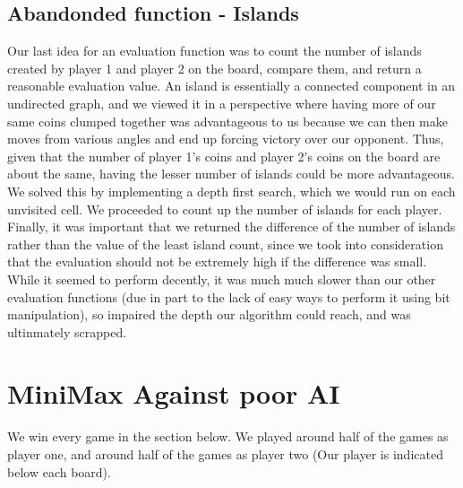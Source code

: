 \documentclass{article}
\begin{document}
\subsection{Abandonded function - Islands}
Our last idea for an evaluation function was to count the number of islands created by player 1 and player 2 on the board, compare them, and return a reasonable evaluation value. An island is essentially a connected component in an undirected graph, and we viewed it in a perspective where having more of our same coins clumped together was advantageous to us because we can then make moves from various angles and end up forcing victory over our opponent. Thus, given that the number of player 1's coins and player 2's coins on the board are about the same, having the lesser number of islands could be more advantageous. We solved this by implementing a depth first search, which we would run on each unvisited cell. We proceeded to count up the number of islands for each player. Finally, it was important that we returned the difference of the number of islands rather than the value of the least island count, since we took into consideration that the evaluation should not be extremely high if the difference was small. While it seemed to perform decently, it was much much slower than our other evaluation functions (due in part to the lack of easy ways to perform it using bit manipulation), so impaired the depth our algorithm could reach, and was ultinmately scrapped.

\newpage
\section{MiniMax Against poor AI}
We win every game in the section below. We played around half of the games as player one, and around half of the games as player two (Our player is indicated below each board).
\end{document}
